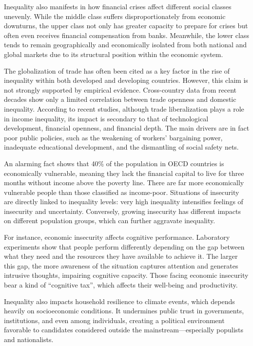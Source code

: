 Inequality also manifests in how financial crises affect different social classes unevenly. While the middle class suffers disproportionately from economic downturns, the upper class not only has greater capacity to prepare for crises but often even receives financial compensation from banks. Meanwhile, the lower class tends to remain geographically and economically isolated from both national and global markets due to its structural position within the economic system.

The globalization of trade has often been cited as a key factor in the rise of inequality within both developed and developing countries. However, this claim is not strongly supported by empirical evidence. Cross-country data from recent decades show only a limited correlation between trade openness and domestic inequality. According to recent studies, although trade liberalization plays a role in income inequality, its impact is secondary to that of technological development, financial openness, and financial depth. The main drivers are in fact poor public policies, such as the weakening of workers’ bargaining power, inadequate educational development, and the dismantling of social safety nets.

An alarming fact shows that 40\% of the population in OECD countries is economically vulnerable, meaning they lack the financial capital to live for three months without income above the poverty line. There are far more economically vulnerable people than those classified as income-poor. Situations of insecurity are directly linked to inequality levels: very high inequality intensifies feelings of insecurity and uncertainty. Conversely, growing insecurity has different impacts on different population groups, which can further aggravate inequality.

For instance, economic insecurity affects cognitive performance. Laboratory experiments show that people perform differently depending on the gap between what they need and the resources they have available to achieve it. The larger this gap, the more awareness of the situation captures attention and generates intrusive thoughts, impairing cognitive capacity. Those facing economic insecurity bear a kind of “cognitive tax”, which affects their well-being and productivity.

Inequality also impacts household resilience to climate events, which depends heavily on socioeconomic conditions. It undermines public trust in governments, institutions, and even among individuals, creating a political environment favorable to candidates considered outside the mainstream—especially populists and nationalists.

